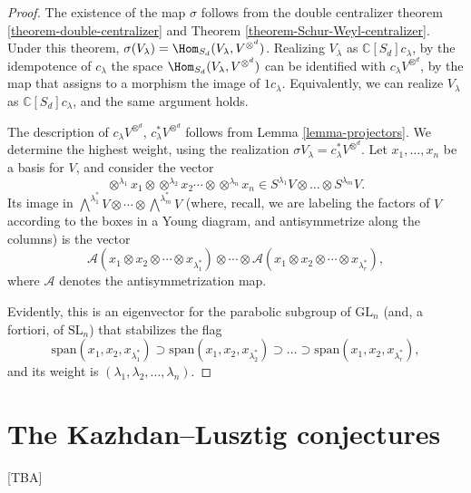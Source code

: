 \begin{proof}
 The existence of the map $\sigma$ follows from the double centralizer theorem \ref{theorem-double-centralizer} and Theorem \ref{theorem-Schur-Weyl-centralizer}. Under this theorem, $\sigma(V_\lambda) = \Hom_{S_d} (V_\lambda, V^{\otimes^d})$. Realizing $V_\lambda$ as $\mathbb C[S_d]c_\lambda$, by the idempotence of $c_\lambda$ the space $\Hom_{S_d} (V_\lambda, V^{\otimes^d})$ can be identified with $c_\lambda V^{\otimes^d}$, by the map that assigns to a morphism the image of $1c_\lambda$. Equivalently, we can realize $V_\lambda$ as $\mathbb C[S_d]c_\lambda$, and the same argument holds. 
 
 The description of $c_\lambda V^{\otimes^d}$, $c_\lambda^* V^{\otimes^d}$ follows from Lemma \ref{lemma-projectors}. We determine the highest weight, using the realization $\sigma V_\lambda = c_\lambda^* V^{\otimes^d}$. Let $x_1, \dots, x_n$ be a basis for $V$, and consider the vector
 $$ \otimes^{\lambda_1} x_1 \otimes \otimes^{\lambda_2} x_2 \cdots \otimes \otimes^{\lambda_n} x_n \in S^{\lambda_1} V \otimes \dots \otimes S^{\lambda_m} V.$$
 Its image in $\bigwedge^{\lambda_1^*}V \otimes \cdots \otimes \bigwedge^{\lambda_m^*} V$ (where, recall, we are labeling the factors of $V$ according to the boxes in a Young diagram, and antisymmetrize along the columns) is the vector 
 $$ \mathcal A(x_1\otimes x_2 \otimes\cdots\otimes x_{\lambda^*_1}) \otimes \cdots \otimes \mathcal A(x_1\otimes x_2 \otimes\cdots\otimes x_{\lambda^*_r}),$$
 where $\mathcal A$ denotes the antisymmetrization map. 
 
 Evidently, this is an eigenvector for the parabolic subgroup of $\text{GL}_n$ (and, a fortiori, of $\text{SL}_n$) that stabilizes the flag 
 $$ \text{span}(x_1,x_2, x_{\lambda^*_1}) \supset \text{span}(x_1,x_2, x_{\lambda^*_2}) \supset \dots \supset \text{span}(x_1,x_2, x_{\lambda^*_r}),$$
 and its weight is $(\lambda_1, \lambda_2 ,\dots, \lambda_n)$. 
 
 
\end{proof}

\section{The Kazhdan--Lusztig conjectures}
\label{section-Kazhdan-Lusztig}

[TBA]








